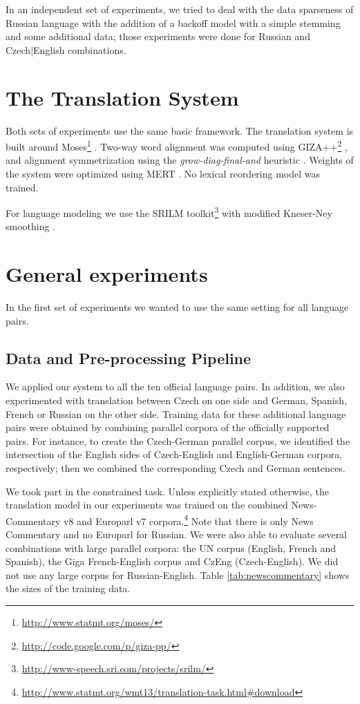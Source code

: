 \documentclass[11pt,letterpaper]{article}
\def\parcite#1{\cite{#1}}  %
\def\parcite#1{\cite{#1}}
\begin{document}
In an independent set of experiments, we tried to deal with the data sparseness of Russian language with the addition of a backoff model with a simple stemming and some additional data; those experiments were done for Russian and Czech|English combinations.


\section{The Translation System}
\label{sec:system}

Both sets of experiments use the same basic framework. The translation system is built around Moses\footnote{\url{http://www.statmt.org/moses/}} \parcite{moses}. Two-way word alignment was computed using GIZA++\footnote{\url{http://code.google.com/p/giza-pp/}} \parcite{giza}, and alignment symmetrization using the \textit{grow-diag-final-and} heuristic \parcite{grow-diag-final-and}. Weights of the system were optimized using MERT \parcite{mert}. No lexical reordering model was trained.

For language modeling we use the SRILM toolkit\footnote{\url{http://www-speech.sri.com/projects/srilm/}} \parcite{srilm} with modified Kneser-Ney smoothing \parcite{kneser-ney,modified-kneser-ney}.

\section{General experiments}
In the first set of experiments we wanted to use the same setting for all language pairs.

\subsection{Data and Pre-processing Pipeline}

We applied our system to all the ten official language pairs. In addition, we also experimented with translation between Czech on one side and German, Spanish, French or Russian on the other side. Training data for these additional language pairs were obtained by combining parallel corpora of the officially supported pairs. For instance, to create the Czech-German parallel corpus, we identified the intersection of the English sides of Czech-English and English-German corpora, respectively; then we combined the corresponding Czech and German sentences.

We took part in the constrained task. Unless explicitly stated otherwise, the translation model in our experiments was trained on the combined News-Commentary v8 and Europarl v7 corpora.\footnote{\url{http://www.statmt.org/wmt13/translation-task.html\#download}}
Note that there is only News Commentary and no Europarl for Russian.
We were also able to evaluate several combinations with large parallel corpora:
the UN corpus (English, French and Spanish), the Giga French-English corpus and CzEng
(Czech-English). We did not use any large corpus for Russian-English.
Table \ref{tab:newscommentary} shows the sizes of the training data.
\end{document}
